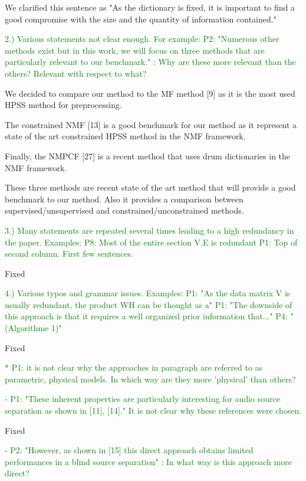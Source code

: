 \documentclass[]{article}
\begin{document}
We clarified this sentence as "As the dictionary is fixed, it is important to find a good compromise with the size and the quantity of information contained."

\textcolor{green}{2.) Various statements not clear enough. For example:
P2: "Numerous other methods exist but in this work, we will focus on three methods that are particularly relevant to our benchmark." : Why are these more relevant than the others? Relevant with respect to what?
}

We decided to compare our method to the MF method [9] as it is the most used HPSS method for preprocessing. 

The constrained NMF [13] is a good benchmark for our method as it represent a state of the art constrained HPSS method in the NMF framework. 

Finally, the NMPCF [27] is a recent method that uses drum dictionaries in the NMF framework. 

These three methods are recent state of the art method that will provide a good benchmark to our method. Also it provides a comparison between supervised/unsupervised and constrained/unconstrained methods. 

\textcolor{green}{3.) Many statements are repeated several times leading to a high redundancy in the paper. Examples:
P8: Most of the entire section V.E is redundant
P1: Top of second column. First few sentences.
}

Fixed


\textcolor{green}{4.) Various typos and grammar issues. Examples:
P1: "As the data matrix V is usually redundant, the product WH can be thought as a"
P1: "The downside of this approach is that it requires a well organized prior information that..."
P4: "(Algorithme 1)"
}

Fixed

\textcolor{green}{  * P1: it is not clear why the approaches in paragraph are referred to as parametric, physical models. In which way are they more 'physical' than others?}


\textcolor{green}{- P1: "These inherent properties are particularly interesting for audio source separation as shown in [11], [14]." It is not clear why these references were chosen.}

Fixed

\textcolor{green}{- P2: "However, as shown in [15] this direct approach obtains limited performances in a blind source separation" : In what way is this approach more direct?}
\end{document}
